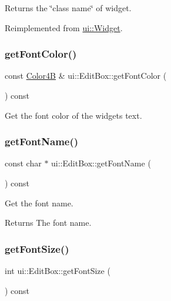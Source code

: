 Returns the \char`\"{}class name\char`\"{} of widget. 

Reimplemented from \hyperlink{classui_1_1Widget_ad85abdaa9133dc6b8efc32670ae9b93f}{ui\+::\+Widget}.

\mbox{\label{classui_1_1EditBox_aa8acef6afc41d2dadd4f1985a3d18231}} 
\subsubsection{\texorpdfstring{get\+Font\+Color()}{getFontColor()}}
{\footnotesize\ttfamily const \hyperlink{structColor4B}{Color4B} \& ui\+::\+Edit\+Box\+::get\+Font\+Color (\begin{DoxyParamCaption}{ }\end{DoxyParamCaption}) const}

Get the font color of the widget\textquotesingle{}s text. \mbox{\label{classui_1_1EditBox_a451027736ac41aa82930bdd05e8602c2}} 
\subsubsection{\texorpdfstring{get\+Font\+Name()}{getFontName()}}
{\footnotesize\ttfamily const char $\ast$ ui\+::\+Edit\+Box\+::get\+Font\+Name (\begin{DoxyParamCaption}{ }\end{DoxyParamCaption}) const}

Get the font name. \begin{DoxyReturn}{Returns}
The font name. 
\end{DoxyReturn}
\mbox{\label{classui_1_1EditBox_a815da9992ba29b9b50a6d9acd84006eb}} 
\subsubsection{\texorpdfstring{get\+Font\+Size()}{getFontSize()}}
{\footnotesize\ttfamily int ui\+::\+Edit\+Box\+::get\+Font\+Size (\begin{DoxyParamCaption}{ }\end{DoxyParamCaption}) const}

